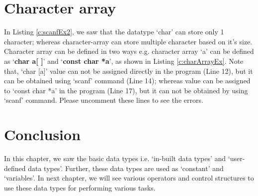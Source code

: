 \section{Character array}\label{sec:chArray}
In Listing \ref{c:scanfEx2}, we saw that the datatype `char' can store only 1 character; whereas character-array can store multiple character based on it's size. Character array can be defined in two ways e.g. character array `a' can be defined as `\textbf{char a[ ]}' and `\textbf{const char *a}', as shown in Listing \ref{c:charArrayEx}. Note that, `char [a]' value can not be assigned directly in the program (Line 12), but it can be obtained using `scanf' command (Line 14); whereas value can be assigned to `const char *a' in the program (Line 17), but it can not be obtained by using `scanf' command. Please uncomment these lines to see the errors. 



\section{Conclusion}
In this chapter, we saw the basic data types i.e. `in-built data types' and `user-defined data types'. Further, these data types are used as `constant' and `variables'. In next chapter, we will see various operators and control structures to use these data types for performing various tasks. 